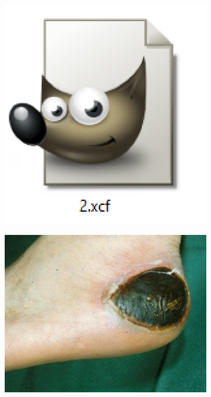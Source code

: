 \begin{figure}[H]
	\centering
	  \begin{subfigure}{0.2\textwidth}
		\centering{}
		\includegraphics[width=\textwidth]{gambar/gambar-3_2(a).png}
		\caption{}
	  \end{subfigure}%
	  \begin{subfigure}{0.2\textwidth}
		\centering{}
		\includegraphics[width=\textwidth]{gambar/gambar-3_2(b).jpg}

\end{subfigure}
\end{figure}
